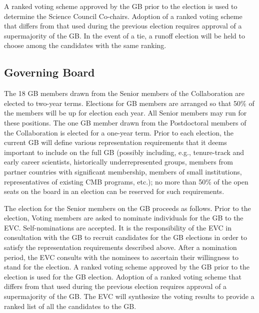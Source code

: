 \documentclass[12pt]{article}
\begin{document}
A ranked voting scheme approved by the GB prior to the election is used to determine the Science Council Co-chairs. Adoption of a ranked voting scheme that differs from that used during the previous election requires approval of a supermajority of the GB. In the event of a tie, a runoff election will be held to choose among the candidates with the same ranking.

\bigskip
\subsection{Governing Board}
\label{sec:gb-elections}

The 18 GB members drawn from the Senior members of the Collaboration are elected to two-year terms. Elections for GB members are arranged so that 50\% of the members will be up for election each year. All Senior members may run for these positions. The one GB member drawn from the Postdoctoral members of the Collaboration is elected for a one-year term. Prior to each election, the current GB will define various representation requirements that it deems important to include on the full GB (possibly including, e.g., tenure-track and early career scientists,  historically underrepresented groups, members from partner countries with significant membership, members of small institutions, representatives of existing CMB programs, etc.); no more than 50\% of the open seats on the board in an election can be reserved for such requirements.

The election for the Senior members on the GB proceeds as follows. 
Prior to the election, Voting members are asked to nominate individuals for the GB to the EVC. Self-nominations are accepted. It is the responsibility of the EVC in consultation with the GB to recruit candidates for the GB elections in order to satisfy the representation requirements described above. After a nomination period, the EVC consults with the nominees to ascertain their willingness to stand for the election. A ranked voting scheme approved by the GB prior to the election is used for the GB election. Adoption of a ranked voting scheme that differs from that used during the previous election requires approval of a supermajority of the GB. The EVC will synthesize the voting results to provide a ranked list of all the candidates to the GB. 
\end{document}
